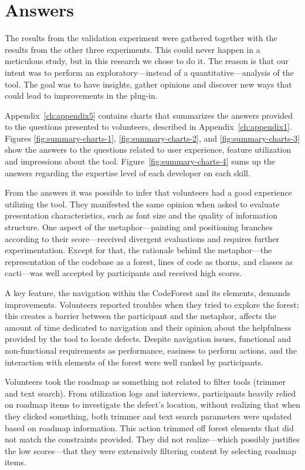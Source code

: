 \section{Answers}\label{sec:answers}

The results from the validation experiment were gathered together with the
results from the other three experiments. This could never happen in a
meticulous study, but in this research we chose to do it. The reason is that
our intent was to perform an exploratory---instead of a quantitative---analysis of
the tool. The goal was to have insights, gather opinions and discover new ways
that could lead to improvements in the plug-in.

Appendix~\ref{ch:appendix5} contains charts that summarizes the answers provided to
the questions presented to volunteers, described in Appendix~\ref{ch:appendix1}.
Figures \ref{fig:summary-charts-1}, \ref{fig:summary-charts-2}, and
\ref{fig:summary-charts-3} show the answers to the questions related to user
experience, feature utilization and impressions about the tool.
Figure~\ref{fig:summary-charts-4} sums up the answers regarding the expertise
level of each developer on each skill.

From the answers it was possible to infer that volunteers had a good experience
utilizing the tool. They manifested the same opinion when asked to evaluate
presentation characteristics, such as font size and the quality of information
structure. One aspect of the metaphor---painting and positioning branches
according to their score---received divergent evaluations and requires further
experimentation. Except for that, the rationale behind the metaphor---the
representation of the codebase as a forest, lines of code as thorns, and classes
as cacti---was well accepted by participants and received high scores.

A key feature, the navigation within the CodeForest and its elements, demands
improvements. Volunteers reported troubles when they tried to explore the
forest; this  creates a barrier between the participant and the metaphor,
affects the amount of time dedicated to navigation and their opinion about the
helpfulness provided by the tool to locate defects. Despite navigation issues,
functional and non-functional requirements as performance, easiness to perform
actions, and the interaction with elements of the forest were well ranked by
participants.

Volunteers took the roadmap as something not related to filter tools (trimmer
and text search). From utilization logs and interviews, participants heavily relied
on roadmap items to investigate the defect's location, without realizing that
when they clicked something, both trimmer and text search parameters were
updated based on roadmap information. This action trimmed off forest elements
that did not match the constraints provided. They did not realize---which
possibly justifies the low scores---that they were extensively filtering content
by selecting roadmap items.


